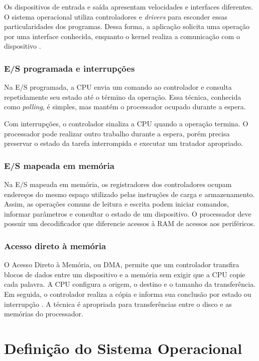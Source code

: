 \documentclass[
    12pt,
    openright,
    a4paper,
    english,
    brazilian
]{abntex2}
\begin{document}
Os dispositivos de entrada e saída apresentam velocidades e interfaces diferentes. O sistema operacional utiliza controladores e \emph{drivers} para esconder essas particularidades dos programas. Dessa forma, a aplicação solicita uma operação por uma interface conhecida, enquanto o kernel realiza a comunicação com o dispositivo \cite{love2010,stallings2018}.

\subsection{E/S programada e interrupções}

Na E/S programada, a CPU envia um comando ao controlador e consulta repetidamente seu estado até o término da operação. Essa técnica, conhecida como \emph{polling}, é simples, mas mantém o processador ocupado durante a espera.

Com interrupções, o controlador sinaliza a CPU quando a operação termina. O processador pode realizar outro trabalho durante a espera, porém precisa preservar o estado da tarefa interrompida e executar um tratador apropriado.

\subsection{E/S mapeada em memória}

Na E/S mapeada em memória, os registradores dos controladores ocupam endereços do mesmo espaço utilizado pelas instruções de carga e armazenamento. Assim, as operações comuns de leitura e escrita podem iniciar comandos, informar parâmetros e consultar o estado de um dispositivo. O processador deve possuir um decodificador que diferencie acessos à RAM de acessos aos periféricos.

\subsection{Acesso direto à memória}

O Acesso Direto à Memória, ou DMA, permite que um controlador transfira blocos de dados entre um dispositivo e a memória sem exigir que a CPU copie cada palavra. A CPU configura a origem, o destino e o tamanho da transferência. Em seguida, o controlador realiza a cópia e informa sua conclusão por estado ou interrupção \cite{patterson2014}. A técnica é apropriada para transferências entre o disco e as memórias do processador.

\chapter{Definição do Sistema Operacional}
\end{document}
